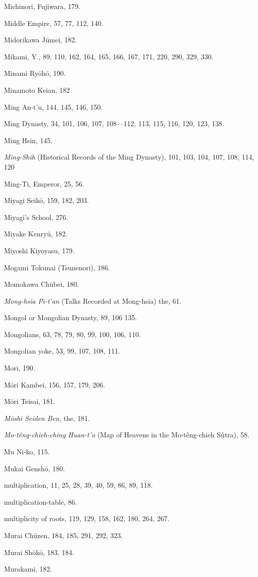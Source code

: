 \documentclass[11pt]{article}
\begin{document}
Michinori, Fujiwara, 179.\par
Middle Empire, 57, 77, 112, 140.\par
Midorikawa Jūmei, 182.\par
Mikami, Y., 89, 110, 162, 164, 165, 166, 167, 171, 220, 290, 329, 330.\par
Minami Ryōhō, 190.\par
Minamoto Keian, 182\par
Ming An-t'u, 144, 145, 146, 150.\par
Ming Dynasty, 34, 101, 106, 107, 108—112, 113, 115, 116, 120, 123, 138.\par
Ming Hsin, 145.\par
\emph{Ming-Shih} (Historical Records of the Ming Dynasty), 101, 103, 104, 107, 108, 114, 120\par
Ming-Ti, Emperor, 25, 56.\par
Miyagi Seikō, 159, 182, 203.\par
Miyagi's School, 276.\par
Miyake Kenryū, 182.\par
Miyoshi Kiyoyasu, 179.\par
Mogami Tokunai (Tsunenori), 186.\par
Momokawa Chūbei, 180.\par
\emph{Mong-hsia Pi-t'an} (Talks Recorded at Mong-hsia) the, 61.\par
Mongol or Mongolian Dynasty, 89, 106 135.\par
Mongolians, 63, 78, 79, 80, 99, 100, 106, 110.\par
Mongolian yoke, 53, 99, 107, 108, 111.\par
Mori, 190.\par
Mōri Kambei, 156, 157, 179, 206.\par
Mōri Teisai, 181.\par
\emph{Mōshi Seiden Ben}, the, 181.\par
\emph{Mo-têng-chieh-ching Huan-t'u} (Map of Heavens in the Mo-têng-chieh Sûtra), 58.\par
Mu Ni-ko, 115.\par
Mukai Genshō, 180.\par
multiplication, 11, 25, 28, 39, 40, 59, 86, 89, 118.\par
multiplication-table, 86.\par
multiplicity of roots, 119, 129, 158, 162, 180, 264, 267.\par
Murai Chūzen, 184, 185, 291, 292, 323.\par
Murai Shōkō, 183, 184.\par
Murakami, 182.\par
\end{document}
